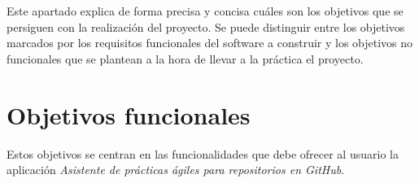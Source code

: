  \label{sec:objetivos}

Este apartado explica de forma precisa y concisa cuáles son los objetivos que se persiguen con la realización del proyecto. Se puede distinguir entre los objetivos marcados por los requisitos funcionales del software a construir y los objetivos no funcionales que se plantean a la hora de llevar a la práctica el proyecto.

\section{Objetivos funcionales}

Estos objetivos se centran en las funcionalidades que debe ofrecer al usuario la aplicación \textit{Asistente de prácticas ágiles para repositorios en GitHub}.

